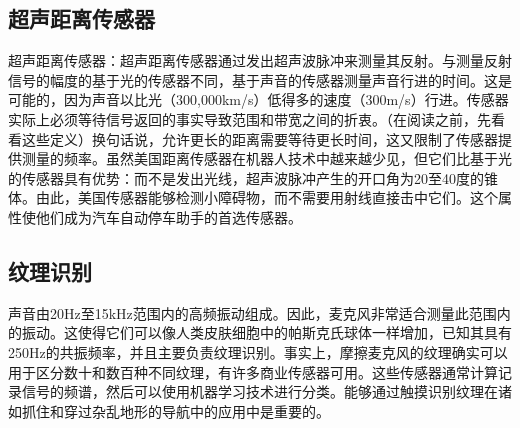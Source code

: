\subsection{超声距离传感器}
超声距离传感器：超声距离传感器通过发出超声波脉冲来测量其反射。与测量反射信号的幅度的基于光的传感器不同，基于声音的传感器测量声音行进的时间。这是可能的，因为声音以比光（300,000km/s）低得多的速度（300m/s）行进。传感器实际上必须等待信号返回的事实导致范围和带宽之间的折衷。（在阅读之前，先看看这些定义）换句话说，允许更长的距离需要等待更长时间，这又限制了传感器提供测量的频率。虽然美国距离传感器在机器人技术中越来越少见，但它们比基于光的传感器具有优势：而不是发出光线，超声波脉冲产生的开口角为20至40度的锥体。由此，美国传感器能够检测小障碍物，而不需要用射线直接击中它们。这个属性使他们成为汽车自动停车助手的首选传感器。



\subsection{纹理识别}
声音由20Hz至15kHz范围内的高频振动组成。因此，麦克风非常适合测量此范围内的振动。这使得它们可以像人类皮肤细胞中的帕斯克氏球体一样增加，已知其具有250Hz的共振频率，并且主要负责纹理识别。事实上，摩擦麦克风的纹理确实可以用于区分数十和数百种不同纹理\cite{hughes14}，有许多商业传感器可用。这些传感器通常计算记录信号的频谱，然后可以使用机器学习技术进行分类。能够通过触摸识别纹理在诸如抓住和穿过杂乱地形的导航中的应用中是重要的。



